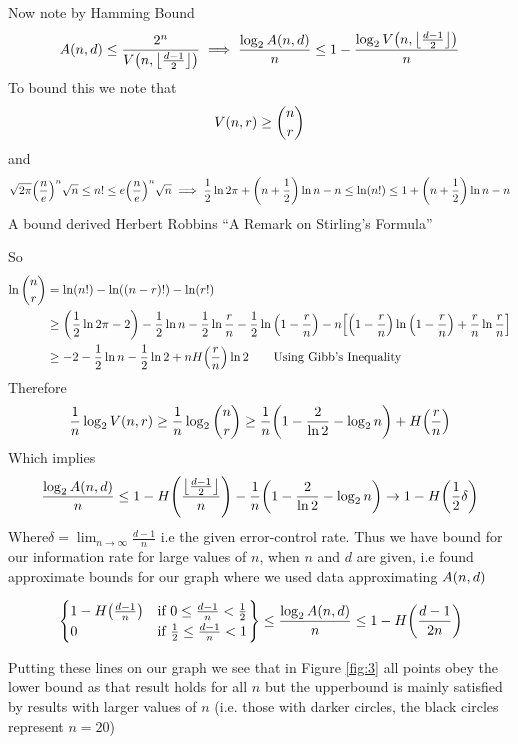 \documentclass[11pt]{article} %
\let\originalleft\left
\let\originalright\right
\renewcommand{\left}{\mathopen{}\mathclose\bgroup\originalleft}
\renewcommand{\right}{\aftergroup\egroup\originalright}
\begin{document}
Now note by Hamming Bound
$$A\left(n, d\right) \leq \frac{2^n}{V\left(n,\left\lfloor \frac{d-1}{2} \right\rfloor\right)} \implies \frac{\log_2{A\left(n, d\right)}}{n}\leq 1 - \frac{\log_2{V\left(n,\left\lfloor \frac{d-1}{2} \right\rfloor\right)}}{n}$$
To bound this we note that
$$V\left(n,r\right) \geq \binom{n}{r}$$
and
$$ \sqrt{2\pi}\left(\frac{n}{e}\right)^n\sqrt{n} \leq n! \leq e\left(\frac{n}{e}\right)^n\sqrt{n} \implies \frac{1}{2}\ln{2\pi}+\left(n + \frac{1}{2}\right)\ln{n} - n \leq \ln\left(n!\right) \leq 1 + \left(n + \frac{1}{2}\right)\ln{n} - n $$
A bound derived Herbert Robbins ``A Remark on Stirling's Formula''

So
\begin{align*}
	\ln{\binom{n}{r}} & = \ln\left(n!\right) - \ln\left(\left(n-r\right)!\right) - \ln\left(r!\right) \\
	& \geq \left(\frac{1}{2}\ln{2\pi}-2\right) - \frac{1}{2}\ln{n}- \frac{1}{2}\ln{\frac{r}{n}}- \frac{1}{2}\ln{\left(1-\frac{r}{n}\right)} - n\left[ \left(1-\frac{r}{n}\right)\ln{\left(1-\frac{r}{n}\right)} + \frac{r}{n}\ln{\frac{r}{n}} \right] \\
	& \geq -2  - \frac{1}{2}\ln{n} - \frac{1}{2}\ln{2} + nH\left(\frac{r}{n}\right)\ln{2} \qquad \text{Using Gibb's Inequality}
\end{align*}
Therefore
$$\frac{1}{n}\log_2{V\left(n,r\right)} \geq \frac{1}{n}\log_2{\binom{n}{r}} \geq \frac{1}{n}\left(1-\frac{2}{\ln{2}}-\log_2{n}\right) + H\left(\frac{r}{n}\right) $$
Which implies
$$\frac{\log_2{A\left(n, d\right)}}{n} \leq  1 - H\left(\frac{  \left\lfloor \frac{d-1}{2} \right\rfloor  }{n}\right) - \frac{1}{n}\left(1-\frac{2}{\ln{2}}-\log_2{n}\right) \to 1 - H\left(\frac{1}{2}\delta\right)$$
Where$\delta = \lim_{n \to \infty}\frac{d-1}{n}$ i.e the given error-control rate. Thus we have bound for our information rate for large values of $n$, when $n$ and $d$ are given, i.e found approximate bounds for our graph where we used data approximating $A\left(n, d\right)$

\begin{equation*}
	\left.
	\begin{cases}
		1 - H\left(\frac{d-1}{n}\right) & \mbox{if } 0 \leq \frac{d-1}{n} < \frac{1}{2} \\
		0 & \mbox{if } \frac{1}{2} \leq \frac{d-1}{n} < 1
	\end{cases}
	\right\}
	\leq \frac{\log_2{A\left(n, d\right)}}{n} \leq 1 - H\left(\frac{d-1}{2n}\right)
\end{equation*}

Putting these lines on our graph we see that in Figure \ref{fig:3} all points obey the lower bound as that result holds for all $n$ but the upperbound is mainly satisfied by results with larger values of $n$ (i.e. those with darker circles, the black circles represent $n=20$)
\end{document}
